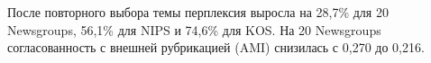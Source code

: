 После повторного выбора темы перплексия выросла на 28,7\% для 20 Newsgroups, 56,1\% для NIPS и 74,6\% для KOS. На 20 Newsgroups согласованность с внешней рубрикацией (AMI) снизилась с 0,270 до 0,216.
